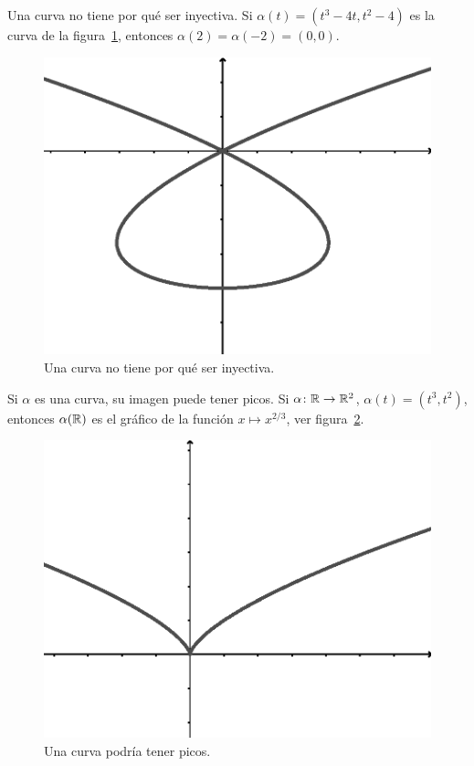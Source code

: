 \begin{example}
	Una curva no tiene por qué ser inyectiva. 
	Si $\alpha(t)=(t^3-4t,t^2-4)$ es la curva de la figura~\ref{fig:not_injective}, 
	entonces $\alpha(2)=\alpha(-2)=(0,0)$.
	\begin{figure}
		\centering
    	\includegraphics[scale=0.5]{eps/notinjective}
		\caption{Una curva no tiene por qué ser inyectiva.}
		\label{fig:not_injective}
	\end{figure}
\end{example}

\begin{example}
	Si $\alpha$ es una curva, su imagen puede tener picos. 
	Si $\alpha\colon\mathbb{R}\to\mathbb{R}^2$, $\alpha(t)=(t^3,t^2)$, entonces $\alpha(\mathbb{R})$ es el gráfico de la función
	$x\mapsto x^{2/3}$, ver figura~\ref{fig:picos}.
	\begin{figure}
		\centering
    	\includegraphics[scale=0.5]{eps/cups}
		\caption{Una curva podría tener picos.}
		\label{fig:picos}
	\end{figure}
\end{example}

